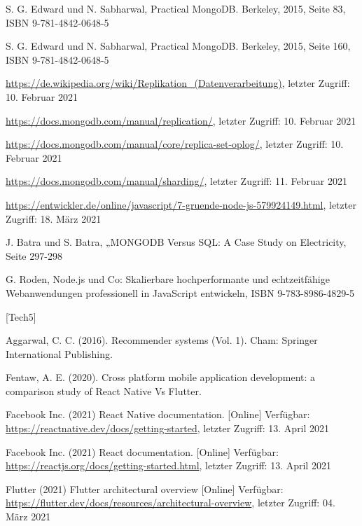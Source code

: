 \documentclass[11pt,a4paper]{article}
\begin{document}
\begin{itemize}
 S. G. Edward und N. Sabharwal, Practical MongoDB. Berkeley, 2015, Seite 83, ISBN 9-781-4842-0648-5

 S. G. Edward und N. Sabharwal, Practical MongoDB. Berkeley, 2015, Seite 160, ISBN 9-781-4842-0648-5

 \url{https://de.wikipedia.org/wiki/Replikation_(Datenverarbeitung)}, letzter Zugriff: 10. Februar 2021

 \url{https://docs.mongodb.com/manual/replication/}, letzter Zugriff: 10. Februar 2021

 \url{https://docs.mongodb.com/manual/core/replica-set-oplog/}, letzter Zugriff: 10. Februar 2021

 \url{https://docs.mongodb.com/manual/sharding/}, letzter Zugriff: 11. Februar 2021

%
%
%
%


 \url{https://entwickler.de/online/javascript/7-gruende-node-js-579924149.html}, letzter Zugriff: 18. März 2021

 J. Batra und S. Batra, „MONGODB Versus SQL: A Case Study on Electricity, Seite 297-298

 G. Roden, Node.js und Co: Skalierbare hochperformante und echtzeitfähige Webanwendungen professionell in JavaScript entwickeln, ISBN 9-783-8986-4829-5

[Tech5]


%
%
%
%
%


	 Aggarwal, C. C. (2016). Recommender systems (Vol. 1). Cham: Springer International Publishing.

	 Fentaw, A. E. (2020). Cross platform mobile application development: a comparison study of React Native Vs Flutter.

	 Facebook Inc. (2021) React Native documentation. [Online] Verfügbar: \url{https://reactnative.dev/docs/getting-started}, letzter Zugriff: 13. April 2021

	 Facebook Inc. (2021) React documentation. [Online] Verfügbar: \url{https://reactjs.org/docs/getting-started.html}, letzter Zugriff: 13. April 2021

	 Flutter (2021) Flutter architectural overview [Online] Verfügbar: \url{https://flutter.dev/docs/resources/architectural-overview}, letzter Zugriff: 04. März 2021


\end{itemize}
\end{document}
